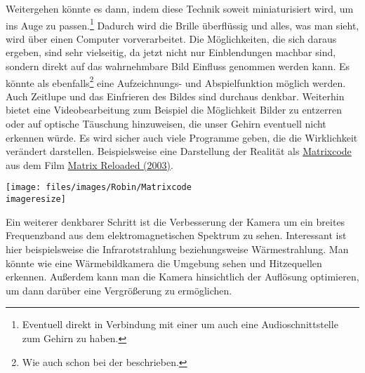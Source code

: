 Weitergehen könnte es dann, indem diese Technik soweit miniaturisiert wird, um ins Auge zu
passen.\footnote{Eventuell direkt in Verbindung mit einer  um auch
eine Audioschnittstelle zum Gehirn zu haben.
} Dadurch wird die Brille überflüssig und alles, was man
sieht, wird über einen Computer vorverarbeitet. Die Möglichkeiten, die sich daraus ergeben, sind sehr
vielseitig, da jetzt nicht nur Einblendungen machbar sind, sondern direkt auf das wahrnehmbare Bild
Einfluss genommen werden kann. Es könnte als ebenfalls\footnote{Wie auch schon bei der
 beschrieben.} eine Aufzeichnungs- und Abspielfunktion möglich
werden. Auch Zeitlupe und das Einfrieren des Bildes sind durchaus denkbar. Weiterhin bietet eine
Videobearbeitung zum Beispiel die Möglichkeit Bilder zu entzerren oder auf optische Täuschung
hinzuweisen, die unser Gehirn eventuell nicht erkennen würde. Es wird sicher auch viele Programme
geben, die die Wirklichkeit verändert darstellen. Beispielsweise eine Darstellung der Realität als
\href{http://www.tony5m17h.net/MatrixCode.gif}{Matrixcode}
aus dem Film \href{http://www.imdb.de/title/tt0234215/}{Matrix Reloaded (2003)}.

\begin{figurewrapper} %
	\texttt{[image: files/images/Robin/Matrixcode\\imageresize]}
	\label{fig:Matrixcode}
\end{figurewrapper}


Ein weiterer denkbarer Schritt ist die Verbesserung der Kamera um ein breites Frequenzband aus dem
elektromagnetischen Spektrum zu sehen. Interessant ist hier beispielsweise die Infrarotstrahlung
beziehungsweise Wärmestrahlung. Man könnte wie eine Wärmebildkamera die Umgebung sehen und
Hitzequellen erkennen. Außerdem kann man die Kamera hinsichtlich der Auflösung optimieren, um dann
darüber eine Vergrößerung zu ermöglichen.%

